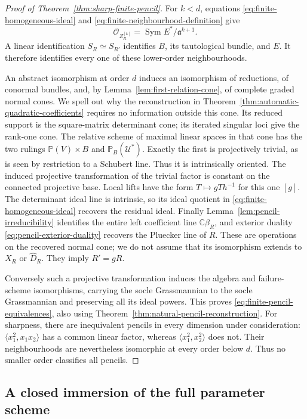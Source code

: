 \documentclass[11pt,reqno]{amsart}
\numberwithin{equation}{section}
\theoremstyle{definition}\newtheorem{definition}[theorem]{Definition}
\theoremstyle{remark}\newtheorem{remark}[theorem]{Remark}
\newcommand{\C}{\mathbb C}\newcommand{\Q}{\mathbb Q}
\newcommand{\Pj}{\mathbb P}\newcommand{\A}{\mathbb A}
\newcommand{\OO}{\mathcal O}\newcommand{\II}{\mathcal I}
\DeclareMathOperator{\Sym}{Sym}\DeclareMathOperator{\Gr}{Gr}
\begin{document}
\begin{proof}[Proof of Theorem~\ref{thm:sharp-finite-pencil}]
For \(k<d\), equations \eqref{eq:finite-homogeneous-ideal}
and \eqref{eq:finite-neighbourhood-definition} give
\[
 \OO_{Z_R^{[k]}}=\Sym E^*/\mathfrak a^{k+1}.
\]
A linear identification \(S_R\simeq S_{R'}\) identifies
\(B\), its tautological bundle, and \(E\).  It therefore
identifies every one of these lower-order neighbourhoods.

An abstract isomorphism at order \(d\) induces an isomorphism
of reductions, of conormal bundles, and, by
Lemma~\ref{lem:first-relation-cone}, of complete graded normal
cones.  We spell out why the reconstruction in
Theorem~\ref{thm:automatic-quadratic-coefficients} requires no
information outside this cone.  Its reduced support is the
square-matrix determinant cone; its iterated singular loci give
the rank-one cone.  The relative scheme of maximal linear spaces
in that cone has the two rulings
\(\Pj(V)\times B\) and \(\Pj_B(\mathcal U^*)\).
Exactly the first is projectively trivial, as is seen by restriction
to a Schubert line.  Thus it is intrinsically oriented.  The
induced projective transformation of the trivial factor is constant
on the connected projective base.  Local lifts have the form
\(T\mapsto gTh^{-1}\) for this one \([g]\).
The determinant ideal line is intrinsic, so its ideal quotient in
\eqref{eq:finite-homogeneous-ideal} recovers the residual ideal.
Finally Lemma~\ref{lem:pencil-irreducibility} identifies the entire
left coefficient line \(\C\beta_R\), and exterior duality
\eqref{eq:pencil-exterior-duality} recovers the Pluecker line of
\(R\).  These are operations on the recovered normal cone;
we do not assume that its isomorphism extends to \(X_R\) or
\(\widehat D_R\).  They imply \(R'=gR\).

Conversely such a projective transformation induces the algebra
and failure-scheme isomorphisms, carrying the socle Grassmannian
to the socle Grassmannian and preserving all its ideal powers.
This proves \eqref{eq:finite-pencil-equivalences}, also using
Theorem~\ref{thm:natural-pencil-reconstruction}.  For sharpness,
there are inequivalent pencils in every dimension under consideration:
\(\langle x_1^2,x_1x_2\rangle\) has a common linear factor,
whereas \(\langle x_1^2,x_2^2\rangle\) does not.  Their
neighbourhoods are nevertheless isomorphic at every order below
\(d\).  Thus no smaller order classifies all pencils.
\end{proof}

\subsection{A closed immersion of the full parameter scheme}
\end{document}
